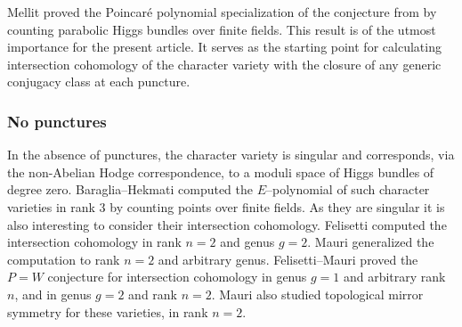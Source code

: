 \documentclass[JEP,XML,SOM,NoEqCountersInSection,Unicode,published]{cedram}
\theoremstyle{definition}
\theoremstyle{plain}
\begin{document}
Mellit \cite{Mellit2020} proved the Poincaré polynomial specialization of the conjecture from \cite{Hausel_Letellier_Villegas} by counting parabolic Higgs bundles over finite fields. This result is of the utmost importance for the present article. It serves as the starting point for calculating intersection cohomology of the character variety with the closure of any generic conjugacy class at each puncture.

\subsubsection{No punctures}
In the absence of punctures, the character variety is singular and corresponds, via the non-Abelian Hodge correspondence, to a moduli space of Higgs bundles of degree zero. Baraglia--Hekmati \cite{Baraglia_Hekmati} computed the $E$--polynomial of such character varieties in rank $3$ by counting points over finite fields. As they are singular it is also interesting to consider their intersection cohomology. Felisetti \cite{Felisetti_2021} computed the intersection cohomology in rank $n=2$ and genus $g=2$. Mauri \cite{Mauri} generalized the computation to rank $n=2$ and arbitrary genus. Felisetti--Mauri \cite{felisetti_mauri} proved the $P=W$ conjecture for intersection cohomology in genus $g=1$ and arbitrary rank $n$, and in genus $g=2$ and rank $n=2$. Mauri \cite{Mauri2021} also studied topological mirror symmetry for these varieties, in rank $n=2$.

\end{document}
